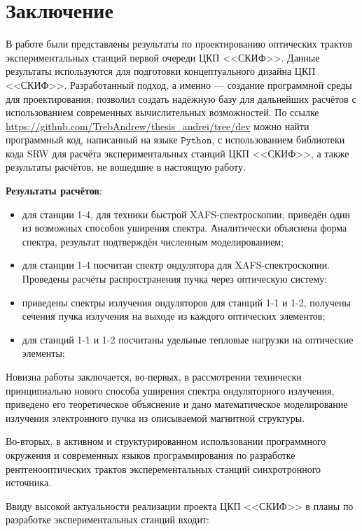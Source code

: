 \chapter*{Заключение}
В работе были представлены результаты по проектированию оптических трактов экспериментальных станций первой очереди ЦКП <<СКИФ>>. Данные результаты используются для подготовки концептуального дизайна ЦКП <<СКИФ>>. Разработанный подход, а именно --- создание программной среды для проектирования, позволил создать надёжную базу для дальнейших расчётов с использованием современных вычислительных возможностей. По ссылке  \url{https://github.com/TrebAndrew/thesis_andrei/tree/dev} можно найти программный код, написанный на языке $\texttt{Python}$, с использованием библиотеки кода SRW для расчёта экспериментальных станций ЦКП <<СКИФ>>, а также результаты расчётов, не вошедшие в настоящую работу.

\textbf{Результаты расчётов}: 
\begin{itemize}
	\item для станции 1-4, для техники быстрой XAFS-спектроскопии, приведён один из возможных способов уширения спектра. Аналитически объяснена форма спектра, результат подтверждён численным моделированием;
	\item для станции 1-4 посчитан спектр ондулятора для XAFS-спектроскопии. Проведены расчёты распространения пучка через оптическую систему;
	\item приведены спектры излучения ондуляторов для станций 1-1 и 1-2, получены сечения пучка излучения на выходе из каждого оптических элементов;
	\item для станций 1-1 и 1-2 посчитаны удельные тепловые нагрузки на оптические элементы;
\end{itemize}

Новизна работы заключается, во-первых, в рассмотрении технически принципиально нового способа уширения спектра ондуляторного излучения, приведено его теоретическое объяснение и дано математическое моделирование излучения электронного пучка из описываемой магнитной структуры.

Во-вторых, в активном и структурированном использовании программного окружения и современных языков программирования по разработке рентгенооптических трактов эксперементальных станций синхротронного источника.

Ввиду высокой актуальности реализации проекта ЦКП <<СКИФ>> в планы по разработке экспериментальных станций входит: 

